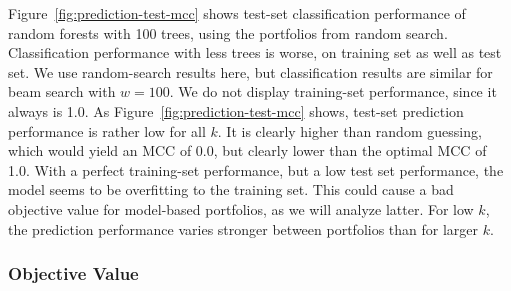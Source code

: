 \documentclass[conference]{IEEEtran}
\begin{document}
Figure~\ref{fig:prediction-test-mcc} shows test-set classification performance of random forests with 100 trees, using the portfolios from random search.
Classification performance with less trees is worse, on training set as well as test set.
We use random-search results here, but classification results are similar for beam search with $w=100$.
We do not display training-set performance, since it always is 1.0.
As Figure~\ref{fig:prediction-test-mcc} shows, test-set prediction performance is rather low for all $k$.
It is clearly higher than random guessing, which would yield an MCC of 0.0, but clearly lower than the optimal MCC of 1.0.
With a perfect training-set performance, but a low test set performance, the model seems to be overfitting to the training set.
This could cause a bad objective value for model-based portfolios, as we will analyze latter.
For low $k$, the prediction performance varies stronger between portfolios than for larger $k$.

\subsubsection{Objective Value}
\end{document}
